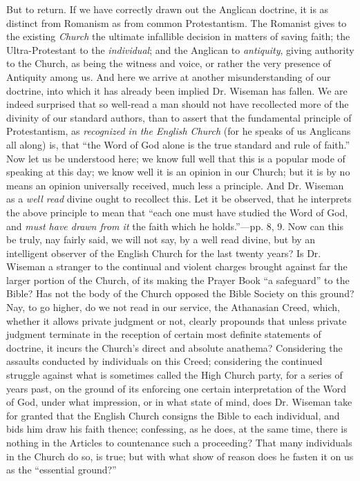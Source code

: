 But to
return. If we have correctly drawn out the Anglican doctrine, it is as
distinct from Romanism as from common Protestantism. The Romanist gives
to the existing \emph{Church} the ultimate infallible decision in
matters of saving faith; the Ultra-Protestant to the \emph{individual};
and the Anglican to \emph{antiquity}, giving authority to the Church, as
being the witness and voice, or rather the very presence of Antiquity
among us. And here we arrive at another misunderstanding of our
doctrine, into which it has already been implied Dr. Wiseman has fallen.
We are indeed surprised that so well-read a man should not have
recollected more of the divinity of our standard authors, than to assert
that the fundamental principle of Protestantism, as \emph{recognized in the
English Church} (for he speaks of us Anglicans all along) is, that ``the Word of God alone is the true standard and rule of faith.'' Now
let us be understood here; we know full well that this is a popular mode
of speaking at this day; we know well it is an opinion in our Church;
but it is by no means an opinion universally received,
much less a principle. And Dr. Wiseman as a \emph{well read} divine
ought to recollect this. Let it be observed, that he interprets the
above principle to mean that ``each one must have studied the Word of
God, and \emph{must have drawn from it} the faith which he
holds.''—pp. 8, 9. Now can this be truly, nay fairly said, we will
not say, by a well read divine, but by an intelligent observer of the
English Church for the last twenty years? Is Dr. Wiseman a stranger to
the continual and violent charges brought against far the larger portion
of the Church, of its making the Prayer Book ``a safeguard'' to the
Bible? Has not the body of the Church opposed the Bible Society on this
ground? Nay, to go higher, do we not read in our service, the Athanasian
Creed, which, whether it allows private judgment or not, clearly
propounds that unless private judgment terminate in the reception of
certain most definite statements of doctrine, it incurs the Church's
direct and absolute anathema? Considering the assaults conducted by
individuals on this Creed; considering the continued struggle against
what is sometimes called the High Church party, for a series of years
past, on the ground of its enforcing one certain interpretation of the
Word of God, under what impression, or in what state of mind, does Dr.
Wiseman take for granted that the English Church consigns the Bible to
each individual, and bids him draw his faith thence; confessing, as he
does, at the same time, there is nothing in the Articles to countenance
such a proceeding? That many individuals in the Church do so, is true;
but with what show of reason does he fasten it on us as the ``essential
ground?''

